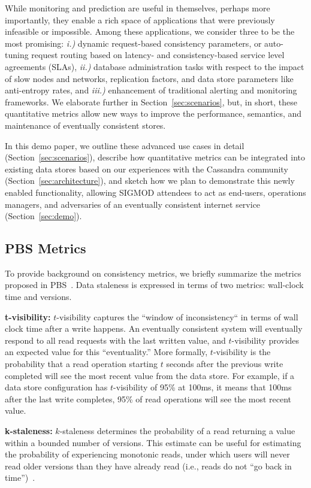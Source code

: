 While monitoring and prediction are useful in themselves, perhaps more
importantly, they enable a rich space of applications that were
previously infeasible or impossible. Among these applications, we
consider three to be the most promising: \textit{i.)} dynamic
request-based consistency parameters, or auto-tuning request routing
based on latency- and consistency-based service level agreements
(SLAs), \textit{ii.)}  database administration tasks with respect to
the impact of slow nodes and networks, replication factors, and data
store parameters like anti-entropy rates, and \textit{iii.)} enhancement
of traditional alerting and monitoring frameworks. We elaborate
further in Section~\ref{sec:scenarios}, but, in short, these
quantitative metrics allow new ways to improve the performance,
semantics, and maintenance of eventually consistent stores.

In this demo paper, we outline these advanced use cases in detail
(Section~\ref{sec:scenarios}), describe how quantitative metrics can
be integrated into existing data stores based on our experiences with
the Cassandra community (Section~\ref{sec:architecture}), and sketch
how we plan to demonstrate this newly enabled functionality, allowing
SIGMOD attendees to act as end-users, operations managers, and
adversaries of an eventually consistent internet service
(Section~\ref{sec:demo}).

\subsection{PBS Metrics}
To provide background on consistency metrics, we briefly summarize the
metrics proposed in PBS~\cite{pbs-vldb2012}. Data
staleness is expressed in terms of two metrics: wall-clock time
and versions.

\textbf{t-visibility:} $t$-visibility captures the ``window of
inconsistency`` in terms of wall clock time after a write happens. An
eventually consistent system will eventually respond to all read
requests with the last written value, and $t$-visibility provides an expected
value for this ``eventuality.''  More formally, $t$-visibility is the
probability that a read operation starting $t$ seconds after the
previous write completed will see the most recent value from the data
store. For example, if a data store configuration has $t$-visibility of
95\% at 100ms, it means that 100ms after the last write completes,
95\% of read operations will see the most recent value.

\textbf{k-staleness:} $k$-staleness determines the probability of a
read returning a value within a bounded number of versions. This
estimate can be useful for estimating the probability of experiencing
monotonic reads, under which users will never read older versions than
they have already read (i.e., reads do not ``go back in
time'')~\cite{vogels-defs}.

